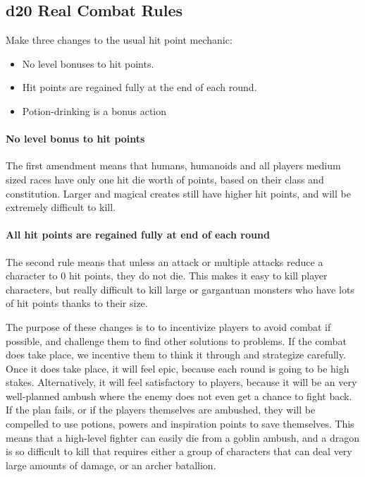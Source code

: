 \documentclass[twocolumn]{dndbook}
\begin{document}
\subsection{d20 Real Combat Rules}

Make three changes to the usual hit point mechanic:
\begin{itemize}
    \item No level bonuses to hit points.
    \item Hit points are regained fully at the end of each round.
    \item Potion-drinking is a bonus action
\end{itemize}

\paragraph*{No level bonus to hit points}
The first amendment means that humans, humanoids and all players medium sized races have only one hit die worth of points, based on their class and constitution.
Larger and magical creates still have higher hit points, and will be extremely difficult to kill.

\paragraph*{All hit points are regained fully at end of each round}
The second rule means that unless an attack or multiple attacks reduce a character to 0 hit points, they do not die.
This makes it easy to kill player characters, but really difficult to kill large or gargantuan monsters who have lots of hit points thanks to their size.\par

The purpose of these changes is to to incentivize players to avoid combat if possible, and challenge them to find other solutions to problems.
If the combat does take place, we incentive them to think it through and strategize carefully.
Once it does take place, it will feel epic, because each round is going to be high stakes.
Alternatively, it will feel satisfactory to players, because it will be an very well-planned ambush where the enemy does not even get a chance to fight back.
If the plan fails, or if the players themselves are ambushed, they will be compelled to use potions, powers and inspiration points to save themselves.
This means that a high-level fighter can easily die from a goblin ambush, and a dragon is so difficult to kill that requires either a group of characters that can deal very large amounts of damage, or an archer batallion.\par
\end{document}
